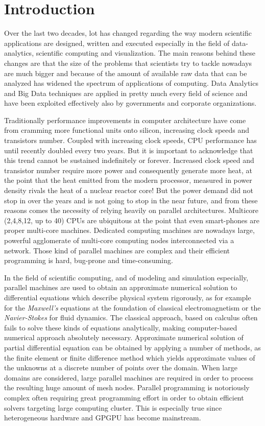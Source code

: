 \chapter{Introduction}


Over the last two decades, lot has changed regarding the way modern scientific applications are designed, written and executed especially in the field of data-analytics, scientific computing and visualization. The main reasons behind these changes are that the size of the problems that scientists try to tackle nowadays are much bigger and because of the amount of available raw data that can be analyzed has widened the spectrum of applications of computing. Data Analytics and Big Data techniques are applied in pretty much every field of science and have been exploited effectively also by governments and corporate organizations.

Traditionally performance improvements in computer architecture have come from cramming more functional units onto silicon, increasing clock speeds and transistors number. Coupled with increasing clock speeds, CPU performance has until recently doubled every two years.  But it is important to acknowledge that this trend cannot be sustained indefinitely or forever. Increased clock speed and transistor number require more power and consequently generate more heat, at the point that the heat emitted from the modern processor, measured in power density rivals the heat of a nuclear reactor core!
But the power demand did not stop in over the years and is not going to stop in the near future,  and from these reasons comes the necessity of relying heavily on parallel architectures. Multicore (2,4,8,12, up to 40) CPUs  are ubiquitous at the point that even smart-phones are proper multi-core machines. Dedicated computing machines are nowadays large, powerful agglomerate of multi-core computing nodes interconnected via a network. Those kind of parallel machines are complex and their efficient programming is hard, bug-prone and time-consuming. 

In the field of scientific computing, and of modeling and simulation especially, parallel machines are used to obtain an approximate numerical solution to differential equations which describe physical system rigorously, as for example for the \textit{Maxwell's} equations at the foundation of classical electromagnetism or the \textit{Navier-Stokes} for fluid dynamics.
The classical approach, based on calculus often fails to solve these kinds of equations analytically, making computer-based numerical approach absolutely necessary.
Approximate numerical solution of partial differential equation can be obtained by applying a number of methods, as the finite element or finite difference method which yields approximate values of the unknowns at a discrete number of points over the domain.
When large domains are considered, large parallel machines are required in order to process the resulting huge amount of mesh nodes. Parallel programming is notoriously complex often requiring great programming effort in order to obtain efficient solvers targeting large computing cluster. This is especially true since heterogeneous hardware and GPGPU has become mainstream.

